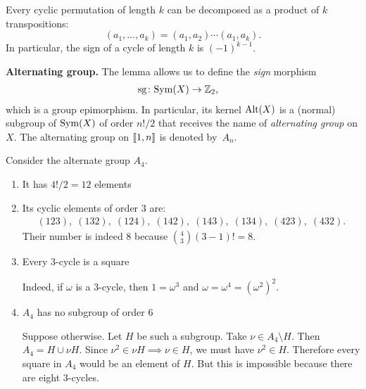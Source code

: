 \begin{rem}\label{rem:cycle-decomposition-and-sign}
    Every cyclic permutation of length $k$ can be decomposed as a product of $k$ transpositions:
    $$
        (a_1,\dots,a_k)=(a_1,a_2)\cdots(a_1,a_k).
    $$
    In particular, the sign of a cycle of length $k$ is $(-1)^{k-1}$.
\end{rem}


{\bf Alternating group.} The lemma allows us to define the \textsl{sign} morphism
\begin{align*}
    \operatorname{sg}\colon{\rm Sym}(X)&\to\mathbb{Z}_2,
\end{align*}
which is a group epimorphism. In particular, its kernel ${\rm Alt}(X)$ is a (normal) subgroup of ${\rm Sym}(X)$ of order $n!/2$ that receives the name of \textsl{alternating group} on $X$. The alternating group on $\llbracket1,n\rrbracket$ is denoted by~$A_n$.

\begin{xmpl} Consider the alternate group $A_4$.
\begin{enumerate}[$\mbf\rightarrowtriangle$]
    \item It has $4!/2=12$ elements
    
    \item  Its cyclic elements of order $3$ are:
        \begin{align*}
            (123),\;(132),\;
            (124),\;(142),\;
            (143),\;(134),\;
            (423),\;(432).
        \end{align*}
        Their number is indeed $8$ because $\binom43(3-1)!=8$.
    
    \item Every $3$-cycle is a square
    
    {\rm Indeed, if $\omega$ is a $3$-cycle, then $1=\omega^3$ and $\omega=\omega^4=(\omega^2)^2$.}

    \item $A_4$ has no subgroup of order $6$
    
    {\rm Suppose otherwise. Let $H$ be such a subgroup. Take $\nu\in A_4\setminus H$. Then $A_4=H\cup \nu H$. Since $\nu^2\in\nu H\implies\nu\in H$, we must have $\nu^2\in H$. Therefore every square in $A_4$ would be an element of $H$. But this is impossible because there are eight $3$-cycles.}
\end{enumerate}
\end{xmpl}


